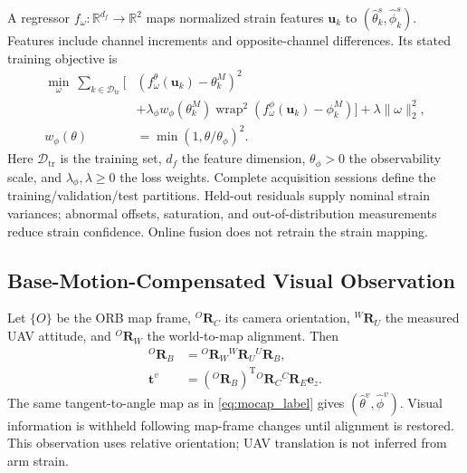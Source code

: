 \documentclass[journal,twoside]{IEEEtran}
\newcommand{\wrap}{\operatorname{wrap}}
\begin{document}
A regressor $f_\omega:\mathbb R^{d_f}\to\mathbb R^2$ maps normalized strain features $\mathbf u_k$ to $(\hat\theta_k^s,\hat\phi_k^s)$. Features include channel increments and opposite-channel differences. Its stated training objective is
\begin{equation}
\begin{aligned}
\min_\omega\ \sum_{k\in\mathcal D_{\mathrm{tr}}}\big[&
(f_\omega^\theta(\mathbf u_k)-\theta_k^M)^2\\
&+\lambda_\phi w_\phi(\theta_k^M)
\wrap^2(f_\omega^\phi(\mathbf u_k)-\phi_k^M)\big]
+\lambda\|\omega\|_2^2,\\
w_\phi(\theta)&=\min(1,\theta/\theta_\phi)^2.
\end{aligned}
\label{eq:strain_training}
\end{equation}
Here $\mathcal D_{\mathrm{tr}}$ is the training set, $d_f$ the feature dimension, $\theta_\phi>0$ the observability scale, and $\lambda_\phi,\lambda\ge0$ the loss weights. Complete acquisition sessions define the training/validation/test partitions. Held-out residuals supply nominal strain variances; abnormal offsets, saturation, and out-of-distribution measurements reduce strain confidence. Online fusion does not retrain the strain mapping.

\subsection{Base-Motion-Compensated Visual Observation}
Let $\{O\}$ be the ORB map frame, ${}^{O}\mathbf R_C$ its camera orientation, ${}^{W}\mathbf R_U$ the measured UAV attitude, and ${}^{O}\mathbf R_W$ the world-to-map alignment. Then
\begin{equation}
\begin{aligned}
{}^{O}\mathbf R_B&={}^O\mathbf R_W{}^W\mathbf R_U{}^U\mathbf R_B,\\
\mathbf t^v&=({}^{O}\mathbf R_B)^{\mathrm T}
{}^{O}\mathbf R_C{}^{C}\mathbf R_E\mathbf e_z.
\end{aligned}
\label{eq:visual_rotation}
\end{equation}
The same tangent-to-angle map as in \eqref{eq:mocap_label} gives $(\hat\theta^v,\hat\phi^v)$. Visual information is withheld following map-frame changes until alignment is restored. This observation uses relative orientation; UAV translation is not inferred from arm strain.
\end{document}
